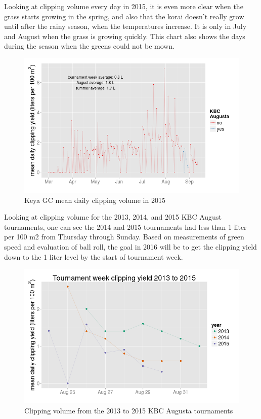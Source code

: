 \documentclass[12pt,b5,]{tufte-book}
\begin{document}
Looking at clipping volume every day in 2015, it is even more clear when the grass starts growing in the spring, and also that the korai doesn't really grow until after the rainy season, when the temperatures increase. It is only in July and August when the grass is growing quickly. This chart also shows the days during the season when the greens could not be mown.

\begin{figure}
\centering
\includegraphics{img/b4-6.png}
\caption{Keya GC mean daily clipping volume in 2015}
\end{figure}

Looking at clipping volume for the 2013, 2014, and 2015 KBC August tournaments, one can see the 2014 and 2015 tournaments had less than 1 liter per 100 m2 from Thursday through Sunday. Based on measurements of green speed and evaluation of ball roll, the goal in 2016 will be to get the clipping yield down to the 1 liter level by the start of tournament week.

\begin{figure}
\centering
\includegraphics{img/b4-7.png}
\caption{Clipping volume from the 2013 to 2015 KBC Augusta tournaments}
\end{figure}
\end{document}
